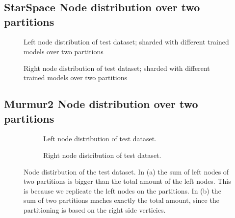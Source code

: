 \chapter{\appendixname}
\section*{StarSpace Node distribution over two partitions}

\begin{figure}[hbt!]
	\centering
	
	\caption{Left node distribution of test dataset; sharded with different trained models over two partitions}
	\label{plot:left-node-distribution}
\end{figure}

\begin{figure}[hbt!]
	\centering
	
	\caption{Right node distribution of test dataset; sharded with different trained models over two partitions}
	\label{plot:right-node-distribution}
\end{figure}

\section*{Murmur2 Node distribution over two partitions}
\begin{figure}[hbt!]
    \centering
	\begin{subfigure}{\textwidth}
		\centering
		
		\caption{Left node distribution of test dataset.}
		\label{plot:left-node-distribution-murmur2}
    \end{subfigure}\qquad

    \begin{subfigure}{\textwidth}
		\centering
		
		\caption{Right node distribution of test dataset.}
		\label{plot:right-node-distribution-murmur2}
    \end{subfigure}\qquad
    
    \caption{Node distirbution of the test dataset. In (a) the sum of left nodes of two partitions is bigger than the total amount of the left nodes. This is because we replicate the left nodes on the partitions. In (b) the sum of two partitions maches exactly the total amount, since the partitioning is based on the right side verticies.}
\end{figure}